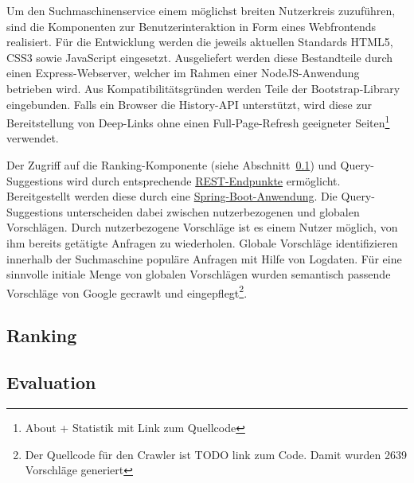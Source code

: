 Um den Suchmaschinenservice einem möglichst breiten Nutzerkreis zuzuführen, sind die
Komponenten zur Benutzerinteraktion in Form eines Webfrontends realisiert. Für die Entwicklung
werden die jeweils aktuellen Standards HTML5, CSS3 sowie JavaScript eingesetzt. 
Ausgeliefert werden diese Bestandteile durch einen Express-Webserver, welcher im Rahmen einer NodeJS-Anwendung betrieben wird.
Aus Kompatibilitätsgründen werden Teile der Bootstrap-Library eingebunden.
Falls ein Browser die History-API unterstützt, wird diese zur
Bereitstellung von Deep-Links ohne einen Full-Page-Refresh
geeigneter Seiten\footnote{About + Statistik mit Link zum Quellcode} verwendet.

Der Zugriff auf die Ranking-Komponente (siehe Abschnitt~\ref{chap:ranking}) und Query-Suggestions wird durch
entsprechende \href{https://en.wikipedia.org/wiki/Representational_state_transfer}{REST-Endpunkte} ermöglicht.
Bereitgestellt werden diese durch eine \href{https://projects.spring.io/spring-boot/}{Spring-Boot-Anwendung}.
Die Query-Suggestions unterscheiden dabei zwischen nutzerbezogenen und globalen Vorschlägen.
Durch nutzerbezogene Vorschläge ist es einem Nutzer möglich, von ihm bereits getätigte Anfragen zu wiederholen.
Globale Vorschläge identifizieren innerhalb der Suchmaschine populäre Anfragen mit Hilfe von Logdaten.
Für eine sinnvolle initiale Menge von globalen Vorschlägen wurden semantisch passende
Vorschläge von Google gecrawlt und eingepflegt\footnote{Der Quellcode für den Crawler ist TODO link zum Code.
Damit wurden 2639 Vorschläge generiert}.


\subsection{Ranking~\cite{croft.chap2}}
\label{chap:ranking}



\subsection{Evaluation~\cite{croft.chap2}}
\label{chap:evaluation}

